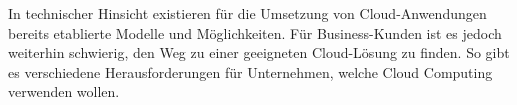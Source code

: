 In technischer Hinsicht existieren für die Umsetzung von Cloud-Anwendungen bereits etablierte Modelle und Möglichkeiten. 
Für Business-Kunden ist es jedoch weiterhin schwierig, den Weg zu einer geeigneten Cloud-Lösung zu finden. 
So gibt es verschiedene Herausforderungen für Unternehmen, welche Cloud Computing verwenden wollen.


